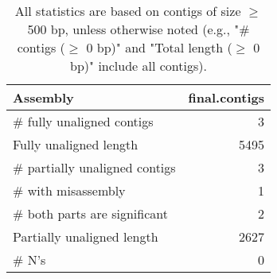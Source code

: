 \documentclass[12pt,a4paper]{article}
\begin{document}
\begin{table}[ht]
\begin{center}
\caption{All statistics are based on contigs of size $\geq$ 500 bp, unless otherwise noted (e.g., "\# contigs ($\geq$ 0 bp)" and "Total length ($\geq$ 0 bp)" include all contigs).}
\begin{tabular}{|l*{1}{|r}|}
\hline
Assembly & final.contigs \\ \hline
\# fully unaligned contigs & 3 \\ \hline
Fully unaligned length & 5495 \\ \hline
\# partially unaligned contigs & 3 \\ \hline
\hspace{5mm}\# with misassembly & 1 \\ \hline
\hspace{5mm}\# both parts are significant & 2 \\ \hline
Partially unaligned length & 2627 \\ \hline
\# N's & 0 \\ \hline
\end{tabular}
\end{center}
\end{table}
\end{document}
